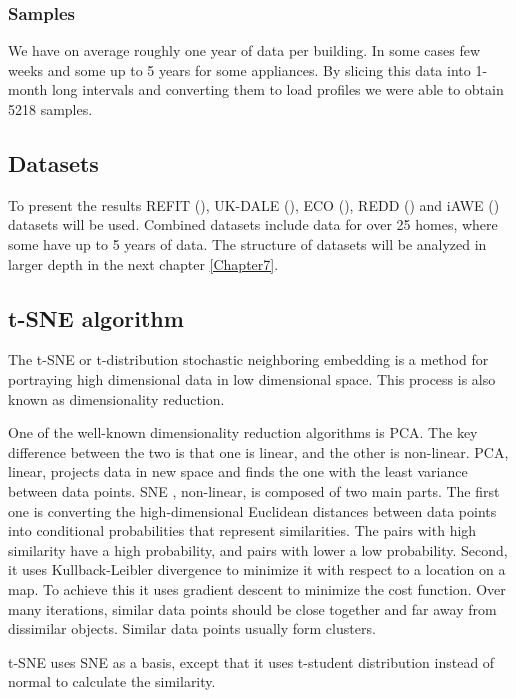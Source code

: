 \subsubsection{Samples}

We have on average roughly one year of data per building. 
In some cases few weeks and some up to 5 years for some appliances.
By slicing this data into 1-month long intervals and converting them to load profiles we were able to obtain 5218 samples.

\subsection{Datasets}

To present the results REFIT (\cite{REFIT}), UK-DALE  (\cite{UKDALE}), ECO  (\cite{ECO}), REDD  (\cite{REDD}) and iAWE  (\cite{iAWE}) datasets will be used.
Combined datasets include data for over 25 homes, where some have up to 5 years of data. 
The structure of datasets will be analyzed in larger depth in the next chapter \ref{Chapter7}. 

\subsection{t-SNE algorithm}

The t-SNE \cite{tsne2} or t-distribution stochastic neighboring embedding is a method for portraying high dimensional 
data in low dimensional space. This process is also known as dimensionality reduction.

One of the well-known dimensionality reduction algorithms is PCA.
The key difference between the two is that one is linear, and the other is non-linear.
PCA, linear, projects data in new space and finds the one with the least variance between data points.
SNE \cite{sne1}, non-linear, is composed of two main parts. The first one is 
converting the high-dimensional Euclidean distances between data points into conditional probabilities that represent similarities. \cite{sne1}
The pairs with high similarity have a high probability, and pairs with lower a low probability.
Second, it uses Kullback-Leibler divergence to minimize it with respect to a location on a map.
To achieve this it uses gradient descent to minimize the cost function.
Over many iterations, similar data points should be close together and far away from dissimilar objects.
Similar data points usually form clusters.

t-SNE uses SNE as a basis, except that it uses t-student distribution instead of normal to calculate the similarity.

